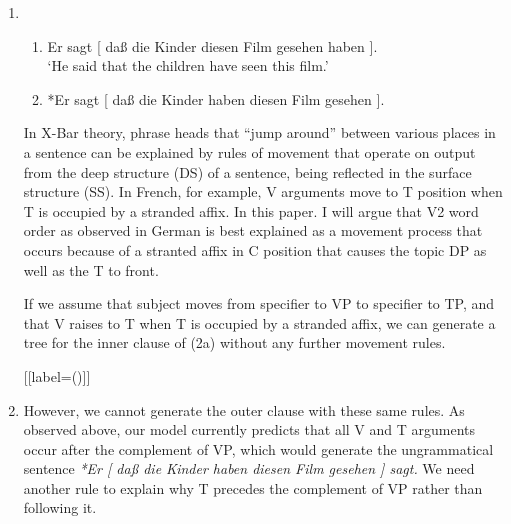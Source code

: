 \documentclass[12pt]{article}
\begin{document}
\begin{enumerate}[label=\textbf{\arabic*.}]
\begin{enumerate}[label=(\arabic*)]
	[{[label=(\arabic*)]}]
		\item
		\begin{enumerate}[label=\alph*.]
		\item Er sagt [ daß die Kinder diesen Film gesehen haben ].\\
		`He said that the children have seen this film.'
		\item *Er sagt [ daß die Kinder haben diesen Film gesehen ].
		\end{enumerate}

	In X-Bar theory, phrase heads that ``jump around'' between various places in a sentence can
	be explained by rules of movement that operate on output from the deep structure (DS) of a
	sentence, being reflected in the surface structure (SS). In French, for example, V arguments
	move to T position when T is occupied by a stranded affix. In this paper. I will argue that
	V2 word order as observed in German is best explained as a movement process that occurs because of a stranted affix
	in C position that causes the topic DP as well as the T to front.

	If we assume that subject moves from specifier to VP to specifier to TP, and that V raises
	to T when T is occupied by a stranded affix, we can generate a tree for the inner clause
	of (2a) without any further movement rules.

	\pagebreak

	[{[label=(\arabic*)]}]
	\item
	\leavevmode\vadjust{\vspace{-\baselineskip}}\newline

	However, we cannot generate the outer clause with these same rules. As observed above,
	our model currently predicts that all V and T arguments occur after the complement of VP,
	which would generate the ungrammatical sentence
	\emph{*Er [ daß die Kinder haben diesen Film gesehen ] sagt. } We need another rule to
	explain why T precedes the complement of VP rather than following it.


\end{enumerate}
\end{enumerate}
\end{document}
